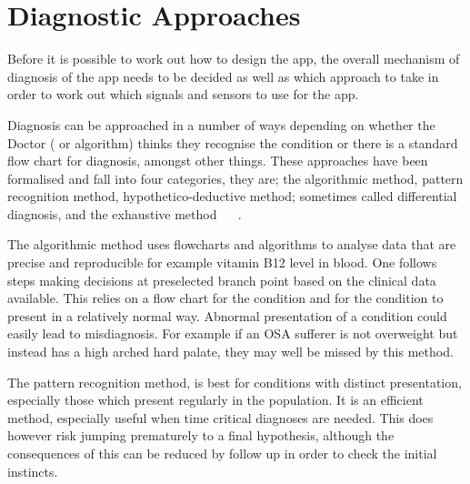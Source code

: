 \section{Diagnostic Approaches}
\label{sec:diagnosticMethods-sophie}
Before it is possible to work out how to design the app, the overall mechanism of diagnosis of the app needs to be decided as well as which approach to take in order to work out which signals and sensors to use for the app.

Diagnosis can be approached in a number of ways depending on whether the Doctor ( or algorithm) thinks they recognise the condition or there is a standard flow chart for diagnosis, amongst other things. These approaches have been formalised and fall into four categories, they are; the algorithmic method, pattern recognition method, hypothetico-deductive method; sometimes called differential diagnosis, and the exhaustive method ~\cite{ebpdiagnosticstrategies} ~\cite{mengel2002fundamentals}.

The algorithmic method uses flowcharts and algorithms to analyse data that are precise and reproducible for example vitamin B12 level in blood. One follows steps making decisions at preselected branch point based on the clinical data available. This relies on a flow chart for the condition and for the condition to present in a relatively normal way. Abnormal presentation of a condition could easily lead to misdiagnosis. For example if an OSA sufferer is not overweight but instead has a high arched hard palate, they may well be missed by this method. 

The pattern recognition method, is best for conditions with distinct presentation, especially those which present regularly in the population. It is an efficient method, especially useful when time critical diagnoses are needed. This does however risk jumping prematurely to a final hypothesis, although the consequences of this can be reduced by follow up in order to check the initial instincts. 


